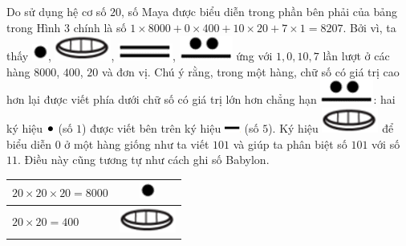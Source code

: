 \begin{multicols}{2}
	Do sử dụng hệ cơ số $20$,  số Maya được biểu diễn trong phần bên phải của bảng trong Hình $3$ chính là số  $1\times 8000+ 0\times 400+ 10\times20+ 7\times1= 8207$. Bởi vì, ta  thấy  \includegraphics[scale=0.3]{33},  \includegraphics[scale=0.3]{34},  \includegraphics[scale=0.3]{35}, \includegraphics[scale=0.3]{36}  ứng với $1, 0, 10, 7$  lần lượt ở các hàng $8000$, $400$, $20$ và đơn vị. Chú ý rằng, trong một hàng, chữ số có giá trị cao hơn lại được viết phía dưới chữ số có giá trị lớn hơn chẳng hạn  \includegraphics[scale=0.3]{36}:  hai ký hiệu \includegraphics[scale=0.7]{37} (số $1$) được viết bên trên ký hiệu \includegraphics[scale=0.7]{38} (số $5$). Ký hiệu \includegraphics[scale=0.3]{34} để biểu diễn $0$ ở một hàng giống như ta viết $101$ và giúp ta phân biệt số $101$ với số $11$. Điều này cũng tương tự như cách ghi số Babylon. 
	\begin{table}[H]
		\vspace*{-5pt}
		\centering
		\captionsetup{labelformat= empty, justification=centering}
		\setlength{\tabcolsep}{21pt}
		\renewcommand{\arraystretch}{1.25}
		\begin{tabular}{|l|c|}
			\hline
			$20\times 20\times 20 =8000$  & \includegraphics[scale=0.3]{33} \\
			\hline
			$20\times 20 =400$     & \includegraphics[scale=0.3]{34} \\

\end{tabular}
\end{table}
\end{multicols}
